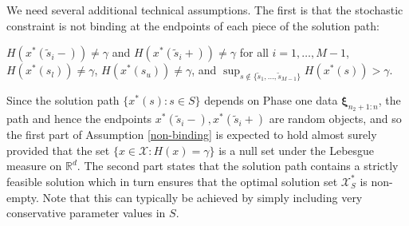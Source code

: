 \documentclass[mnsc,blindrev]{informs4} %
\newcommand{\R}{\mathbb{R}}
\begin{document}
We need several additional technical assumptions. The first is that the stochastic constraint is not binding at the endpoints of each piece of the solution path:
\begin{assumption}\label{non-binding}
$H(x^*(\tilde s_i-))\neq \gamma$ and $H(x^*(\tilde s_i+))\neq \gamma$ for all $i=1,\ldots,M-1$, $H(x^*( s_l))\neq \gamma$, $H(x^*( s_u))\neq \gamma$, and $\sup_{s\notin \{\tilde s_1,\ldots,\tilde s_{M-1}\}}H(x^*(s))> \gamma$.
\end{assumption}
Since the solution path $\{x^*(s):s\in S\}$ depends on Phase one data $\bm{\xi}_{n_2+1:n}$, the path and hence the endpoints $x^*(\tilde s_i-),x^*(\tilde s_i+)$ are random objects, and so the first part of Assumption \ref{non-binding} is expected to hold almost surely provided that the set $\{x\in\mathcal X:H(x)=\gamma\}$ is a null set under the Lebesgue measure on $\R^d$. The second part states that the solution path contains a strictly feasible solution which in turn ensures that the optimal solution set $\mathcal X_S^*$ is non-empty. Note that this can typically be achieved by simply including very conservative parameter values in $S$.
\end{document}
